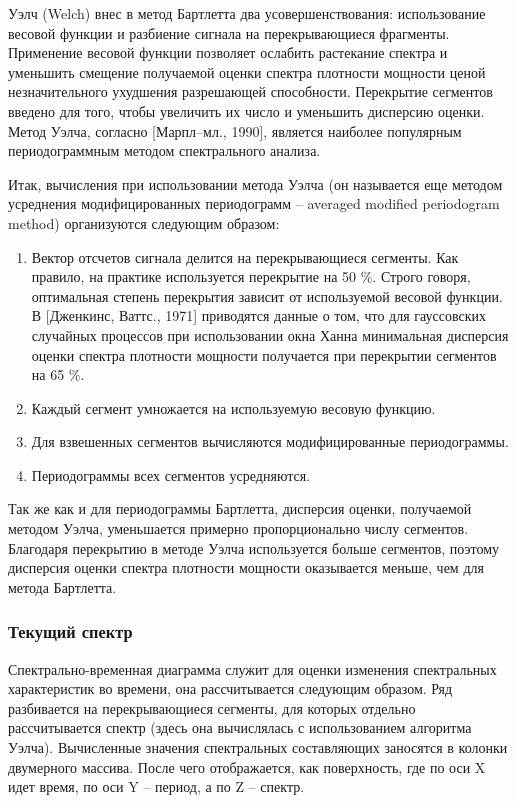 Уэлч (Welch) внес в метод Бартлетта два усовершенствования: использование весовой функции и разбиение сигнала на перекрывающиеся фрагменты. Применение весовой функции позволяет ослабить растекание спектра и уменьшить смещение получаемой оценки спектра плотности мощности ценой незначительного ухудшения разрешающей способности. Перекрытие сегментов введено для того, чтобы увеличить их число и уменьшить дисперсию оценки. Метод Уэлча, согласно [Марпл--мл., 1990], является наиболее популярным периодограммным методом спектрального анализа.

Итак, вычисления при использовании метода Уэлча (он называется еще методом усреднения модифицированных периодограмм -- averaged modified periodogram method) организуются следующим образом:

\begin{enumerate}
\item  Вектор отсчетов сигнала делится на перекрывающиеся сегменты. Как правило, на практике используется перекрытие на 50 \%. Строго говоря, оптимальная степень перекрытия зависит от используемой весовой функции. В [Дженкинс, Ваттс., 1971] приводятся данные о том, что для гауссовских случайных процессов при использовании окна Ханна минимальная дисперсия оценки спектра плотности мощности получается при перекрытии сегментов на 65 \%.

\item  Каждый сегмент умножается на используемую весовую функцию.

\item  Для взвешенных сегментов вычисляются модифицированные периодограммы.

\item  Периодограммы всех сегментов усредняются.
\end{enumerate}

Так же как и для периодограммы Бартлетта, дисперсия оценки, получаемой методом Уэлча, уменьшается примерно пропорционально числу сегментов. Благодаря перекрытию в методе Уэлча используется больше сегментов, поэтому дисперсия оценки спектра плотности мощности оказывается меньше, чем для метода Бартлетта.


\subsubsection{Текущий спектр}

Спектрально-временная диаграмма служит для оценки изменения спектральных характеристик во времени, она рассчитывается следующим образом.  Ряд разбивается на перекрывающиеся сегменты, для которых отдельно рассчитывается спектр (здесь она вычислялась с использованием алгоритма Уэлча). Вычисленные значения спектральных составляющих заносятся в колонки двумерного массива. После чего отображается, как поверхность, где по оси X идет время, по оси Y – период, а по Z – спектр.



